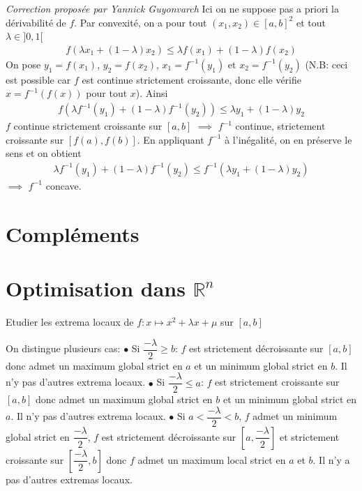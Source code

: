 \documentclass{fancybook}
\begin{document}
\null \hfill \textit{Correction proposée par Yannick Guyonvarch}\newline
Ici on ne suppose pas a priori la dérivabilité de $f$.
\newline
Par convexité, on a pour tout $(x_1,x_2)\in[a,b]^2$ et tout $\lambda\in]0,1[$
\begin{align*}
    f(\lambda x_1+(1-\lambda)x_2)\leq \lambda f(x_1)+(1-\lambda)f(x_2)
\end{align*}
On pose $y_1=f(x_1)$, $y_2=f(x_2)$, $x_1=f^{-1}(y_1)$ et $x_2=f^{-1}(y_2)$ (N.B: ceci est possible car $f$ est continue strictement croissante, donc elle vérifie $x=f^{-1}(f(x))$ pour tout $x$).
\newline
Ainsi
\begin{align*}
    f(\lambda f^{-1}(y_1)+(1-\lambda)f^{-1}(y_2))\leq \lambda y_1+(1-\lambda)y_2
\end{align*}
$f$ continue strictement croissante sur $[a,b]$ $\implies$ $f^{-1}$ continue, strictement croissante sur $[f(a),f(b)]$. En appliquant $f^{-1}$ à l'inégalité, on en préserve le sens et on obtient
\begin{align*}
    \lambda f^{-1}(y_1)+(1-\lambda)f^{-1}(y_2)\leq f^{-1}(\lambda y_1+(1-\lambda)y_2)
\end{align*}
$\implies$ $f^{-1}$ concave.

\newpage
\section{Compléments}

\newpage
\section{Optimisation dans $\mathbb R^n$}

\begin{exercice}
Etudier les extrema locaux de $f:x\mapsto x^2+\lambda x + \mu$ sur $[a,b]$
\end{exercice}
On distingue plusieurs cas: \newline
$\bullet$ Si $\dfrac{-\lambda}{2} \geq b$: $f$ est strictement décroissante sur $[a,b]$ donc admet un maximum global strict en $a$ et un minimum global strict en $b$. Il n'y pas d'autres extrema locaux.\newline 
$\bullet$ Si $\dfrac{-\lambda}{2} \leq a$: $f$ est strictement croissante sur $[a,b]$ donc admet un maximum global strict en $b$ et un minimum global strict en $a$. Il n'y pas d'autres extrema locaux. \newline
$\bullet$ Si $a<\dfrac{-\lambda}{2}<b$, $f$ admet un minimum global strict en $\dfrac{-\lambda}{2}$, $f$ est strictement décroissante sur $[a,\dfrac{-\lambda}{2}]$ et strictement croissante sur $[\dfrac{-\lambda}{2},b]$ donc $f$ admet un maximum local strict en $a$ et $b$. Il n'y a pas d'autres extremas locaux.
\end{document}
